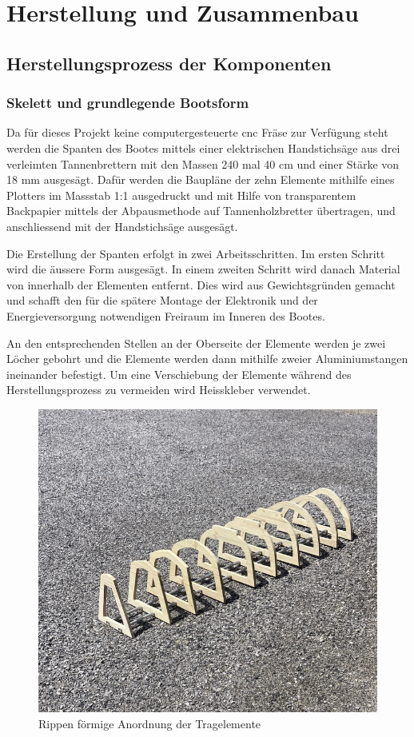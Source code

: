 

\chapter{Herstellung und Zusammenbau}
\label{chap:herstllung}

\section{Herstellungsprozess der Komponenten}
\subsection{Skelett und grundlegende Bootsform}
Da für dieses Projekt keine computergesteuerte \ac{cnc} Fräse zur Verfügung steht werden die Spanten des Bootes mittels einer elektrischen Handstichsäge aus drei verleimten Tannenbrettern mit den Massen 240 mal 40 cm und einer Stärke von 18 mm ausgesägt. Dafür werden die Baupläne der zehn Elemente mithilfe eines Plotters im Massstab 1:1 ausgedruckt und  mit Hilfe von transparentem Backpapier mittels der Abpausmethode auf Tannenholzbretter übertragen, und anschliessend mit der Handstichsäge ausgesägt.

Die Erstellung der Spanten erfolgt in zwei Arbeitsschritten. Im ersten Schritt wird die äussere Form ausgesägt. In einem zweiten Schritt wird danach Material von innerhalb der Elementen entfernt. Dies wird aus Gewichtsgründen gemacht und schafft den für die spätere Montage der Elektronik und der Energieversorgung notwendigen Freiraum im Inneren des Bootes.

An den entsprechenden Stellen an der Oberseite der Elemente werden je zwei Löcher gebohrt und die Elemente werden dann mithilfe zweier Aluminiumstangen ineinander befestigt. Um eine Verschiebung der Elemente während des Herstellungsprozess zu vermeiden wird Heisskleber verwendet. 
\begin{figure}[H]
    \centering
    \includegraphics[width=1\linewidth]{rippe1.png}
    \caption{Rippen förmige Anordnung der Tragelemente}
    \label{fig:enter-label}
\end{figure}

